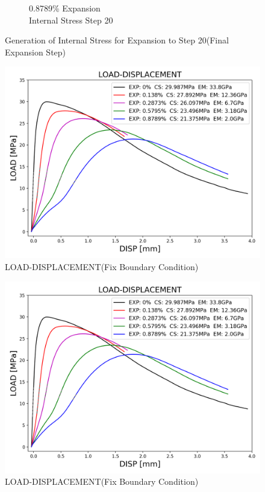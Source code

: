 \begin{figure}[ht!]
\begin{subfigure}{.25\textwidth}
      \caption{0.8789\% Expansion\\Internal Stress Step 20}
    \end{subfigure}

\caption{Generation of Internal Stress for Expansion to Step 20(Final Expansion Step)}
\label{fig:A30_stress}
\end{figure}

\begin{figure}[ht!]
    \centering
    \includegraphics[width=0.8\linewidth]{Files/exp_3D/DEF/S13A30FIXX0-LOAD-DISPLACEMENT.png}
    \caption{LOAD-DISPLACEMENT(Fix Boundary Condition)}
    \label{fig:S13A15FIXX0-LOAD-DISPLACEMENT}
\end{figure}


\begin{figure}[ht!]
    \centering
    \includegraphics[width=0.8\linewidth]{Files/exp_3D/DEF/S13A30FIXX0-LOAD-DISPLACEMENT.png}
    \caption{LOAD-DISPLACEMENT(Fix Boundary Condition)}
    \label{fig:S13A30X0CFIX-LOAD-DISPLACEMENT}
\end{figure}

